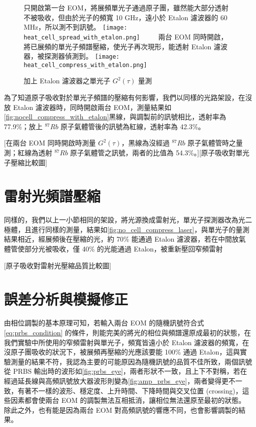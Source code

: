\documentclass[class=NCU_thesis, crop=false]{standalone}
\begin{document}
\begin{figure}[!hbt]
    \centering
    \subcaptionbox
        {只開啟第一台 EOM，將展頻單光子通過原子團，雖然能大部分透射不被吸收，但由於光子的頻寬 10 GHz，遠小於 Etalon 濾波器的 60 MHz，所以測不到訊號。
        \label{fig:spread_single_photon_with_etalon}}
        {\texttt{[image: heat\_cell\_spread\_with\_etalon.png]}}
    ~~~~
    \subcaptionbox
        {兩台 EOM 同時開啟，將已展頻的單光子頻譜壓縮，使光子再次現形，能透射 Etalon 濾波器，被探測器偵測到。
        \label{fig:compress_single_photon_with_etalon}}
        {\texttt{[image: heat\_cell\_compress\_with\_etalon.png]}}
    \caption{加上 Etalon 濾波器之單光子 $G^{2}(\tau)$ 量測}
    \label{fig:single_photon_with_etalon}
\end{figure}

為了知道原子吸收對於單光子頻譜的壓縮有何影響，我們以同樣的光路架設，在沒放 Etalon 濾波器時，同時開啟兩台 EOM，測量結果如\cref{fig:nocell_compress_with_etalon}黑線，與調製前的訊號相比，透射率為 77.9\%；放上 $^{87}Rb$ 原子氣體管後的訊號為紅線，透射率為 42.3\%。

[在兩台 EOM 同時開啟時測量 $G^{2}(\tau)$，黑線為沒經過 $^{87}Rb$ 原子氣體管時之量測；紅線為透射 $^{87}Rb$ 原子氣體管之訊號，兩者的比值為 54.3\%。][原子吸收對單光子壓縮比較圖]

\section{雷射光頻譜壓縮}

同樣的，我們以上一小節相同的架設，將光源換成雷射光，單光子探測器改為光二極體，且進行同樣的測量，結果如\cref{fig:no_cell_compress_laser}，與單光子的量測結果相近，經展頻後在壓縮的光，約 70\% 能通過 Etalon 濾波器，若在中間放氣體管使部分光被吸收，僅 40\% 的光能通過 Etalon，被重新壓回窄頻雷射

[原子吸收對雷射光壓縮品質比較圖]

\section{誤差分析與模擬修正}

由相位調製的基本原理可知，若輸入兩台 EOM 的隨機訊號符合式\cref{eq:prbs_condition} 的條件，則能完美的將光的相位與頻譜還原成最初的狀態，在我們實驗中所使用的窄頻雷射與單光子，頻寬皆遠小於 Etalon 濾波器的頻寬，在沒原子團吸收的狀況下，被展頻再壓縮的光應該要能 100\% 通過 Etalon，這與實驗測量的結果不符，我認為主要的可能原因為隨機訊號的品質不佳所致，兩個訊號從 PRBS 輸出時的波形如\cref{fig:prbs_eye}，兩者形狀不一致，且上下不對稱，若在經過延長線與高頻訊號放大器波形則變為\cref{fig:amp_prbs_eye}，兩者變得更不一致，有著不一樣的波形、穩定度、上升時間、下降時間與交叉位置 (crossing)，這些因素都會使兩台 EOM 的調製無法互相抵消，讓相位無法還原至最初的狀態。除此之外，也有能是因為兩台 EOM 對高頻訊號的響應不同，也會影響調製的結果。
\end{document}

